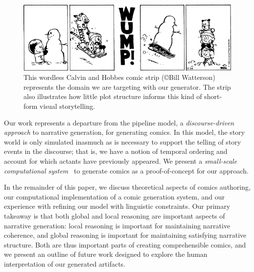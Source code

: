 \begin{figure}
\includegraphics[width=\columnwidth]{calvin-and-hobbes.png}
\caption{
This wordless Calvin and Hobbes comic strip (\copyright Bill Watterson)
represents the domain we are targeting with our generator. The strip also
illustrates how little plot structure informs this kind of short-form visual
storytelling.
}
\label{fig:calvin}
\end{figure}


Our work represents a departure from the pipeline model, a
\emph{discourse-driven approach} to narrative generation, for generating
comics. In this model, the story world is only simulated inasmuch as is
necessary to support the telling of story events in the discourse; that is,
we have a notion of temporal ordering and account for which actants have
previously appeared. We present a \emph{small-scale computational
system}~\cite{montfort2012small} to generate comics as a proof-of-concept
for our approach.

In the remainder of this paper, we discuss theoretical aspects of comics
authoring, our computational implementation of a comic generation system,
and our experience with refining our model with linguistic constraints. Our
primary takeaway is that both global and local reasoning are important
aspects of narrative generation: local reasoning is important for
maintaining narrative coherence, and global reasoning is important for
maintaining satisfying narrative structure. Both are thus important parts
of creating comprehensible comics, and we present an outline of future work
designed to explore the human interpretation of our generated artifacts.

